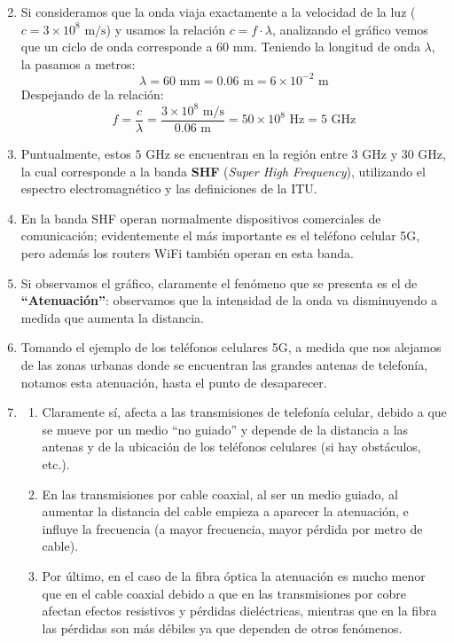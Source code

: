 \documentclass[11pt,a4paper]{article}
\begin{document}
\begin{enumerate}[label=\alph*.]
    \setcounter{enumi}{1}
    \item Si consideramos que la onda viaja exactamente a la velocidad de la luz ($c = 3 \times 10^8 \text{ m/s}$) y usamos la relación $c = f \cdot \lambda$, analizando el gráfico vemos que un ciclo de onda corresponde a $60 \text{ mm}$. Teniendo la longitud de onda $\lambda$, la pasamos a metros:
    \[
    \lambda = 60 \text{ mm} = 0.06 \text{ m} = 6 \times 10^{-2} \text{ m}
    \]
    Despejando de la relación:
    \[
    f = \frac{c}{\lambda} = \frac{3 \times 10^8 \text{ m/s}}{0.06 \text{ m}} = 50 \times 10^8 \text{ Hz} = 5 \text{ GHz}
    \]

    \item Puntualmente, estos $5 \text{ GHz}$ se encuentran en la región entre $3 \text{ GHz}$ y $30 \text{ GHz}$, la cual corresponde a la banda \textbf{SHF} (\textit{Super High Frequency}), utilizando el espectro electromagnético y las definiciones de la ITU.

    \item En la banda SHF operan normalmente dispositivos comerciales de comunicación; evidentemente el más importante es el teléfono celular 5G, pero además los routers WiFi también operan en esta banda.

    \item Si observamos el gráfico, claramente el fenómeno que se presenta es el de \textbf{“Atenuación”}: observamos que la intensidad de la onda va disminuyendo a medida que aumenta la distancia.

    \item Tomando el ejemplo de los teléfonos celulares 5G, a medida que nos alejamos de las zonas urbanas donde se encuentran las grandes antenas de telefonía, notamos esta atenuación, hasta el punto de desaparecer.

    \item 
    \begin{enumerate}[label=\roman*)]
        \item Claramente sí, afecta a las transmisiones de telefonía celular, debido a que se mueve por un medio “no guiado” y depende de la distancia a las antenas y de la ubicación de los teléfonos celulares (si hay obstáculos, etc.).
        \item En las transmisiones por cable coaxial, al ser un medio guiado, al aumentar la distancia del cable empieza a aparecer la atenuación, e influye la frecuencia (a mayor frecuencia, mayor pérdida por metro de cable).
        \item Por último, en el caso de la fibra óptica la atenuación es mucho menor que en el cable coaxial debido a que en las transmisiones por cobre afectan efectos resistivos y pérdidas dieléctricas, mientras que en la fibra las pérdidas son más débiles ya que dependen de otros fenómenos.
    \end{enumerate}
\end{enumerate}
\end{document}
